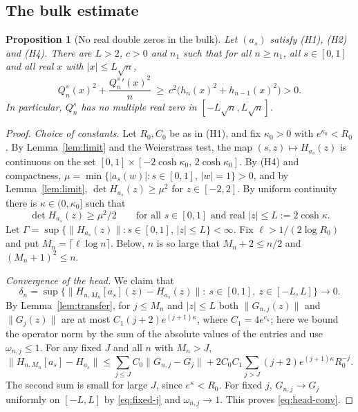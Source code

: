 \documentclass[11pt]{amsart}
\newtheorem{proposition}[theorem]{Proposition}
\theoremstyle{definition}
\theoremstyle{remark}
\numberwithin{equation}{section}
\begin{document}
\subsection{The bulk estimate}

\begin{proposition}[No real double zeros in the bulk]\label{prop:bulk}
Let $(a_s)$ satisfy (H1), (H2) and (H4). There are $L>2$, $c>0$ and $n_1$ such that for all $n\ge n_1$, all $s\in[0,1]$ and all real $x$ with $|x|\le L\sqrt n$,
\[
Q_n^s(x)^2+\frac{Q_n^s{}'(x)^2}{n}\ \ge\ c^2\bigl(h_n(x)^2+h_{n-1}(x)^2\bigr)>0 .
\]
In particular, $Q_n^s$ has no multiple real zero in $[-L\sqrt n,L\sqrt n]$.
\end{proposition}

\begin{proof}
\emph{Choice of constants.} Let $R_0,C_0$ be as in (H1), and fix $\kappa_0>0$ with $e^{\kappa_0}<R_0$. By Lemma~\ref{lem:limit} and the Weierstrass test, the map $(s,z)\mapsto H_{a_s}(z)$ is continuous on the set $[0,1]\times[-2\cosh\kappa_0,\,2\cosh\kappa_0]$. By (H4) and compactness, $\mu=\min\{|a_s(w)|:s\in[0,1],\,|w|=1\}>0$, and by Lemma~\ref{lem:limit}, $\det H_{a_s}(z)\ge\mu^2$ for $z\in[-2,2]$. By uniform continuity there is $\kappa\in(0,\kappa_0]$ such that
\begin{equation}\label{eq:det-lower}
\det H_{a_s}(z)\ge\mu^2/2\qquad\text{for all }s\in[0,1]\text{ and real }|z|\le L:=2\cosh\kappa .
\end{equation}
Let $\Gamma=\sup\{\|H_{a_s}(z)\|:s\in[0,1],\,|z|\le L\}<\infty$. Fix $\ell>1/(2\log R_0)$ and put $M_n=\lceil\ell\log n\rceil$. Below, $n$ is so large that $M_n+2\le n/2$ and $(M_n+1)^2\le n$.

\emph{Convergence of the head.} We claim that
\begin{equation}\label{eq:head-conv}
\delta_n=\sup\bigl\{\|H_{n,M_n}[a_s](z)-H_{a_s}(z)\|:\ s\in[0,1],\ z\in[-L,L]\bigr\}\to0 .
\end{equation}
By Lemma~\ref{lem:transfer}, for $j\le M_n$ and $|z|\le L$ both $\|G_{n,j}(z)\|$ and $\|G_j(z)\|$ are at most $C_1(j+2)e^{(j+1)\kappa}$, where $C_1=4e^{c_\kappa}$; here we bound the operator norm by the sum of the absolute values of the entries and use $\omega_{n,j}\le1$. For any fixed $J$ and all $n$ with $M_n>J$,
\[
\|H_{n,M_n}[a_s]-H_{a_s}\|\le\sum_{j\le J}C_0\|G_{n,j}-G_j\|+2C_0C_1\sum_{j>J}(j+2)e^{(j+1)\kappa}R_0^{-j}.
\]
The second sum is small for large $J$, since $e^{\kappa}<R_0$. For fixed $j$, $G_{n,j}\to G_j$ uniformly on $[-L,L]$ by \eqref{eq:fixed-j} and $\omega_{n,j}\to1$. This proves \eqref{eq:head-conv}.


\end{proof}
\end{document}
